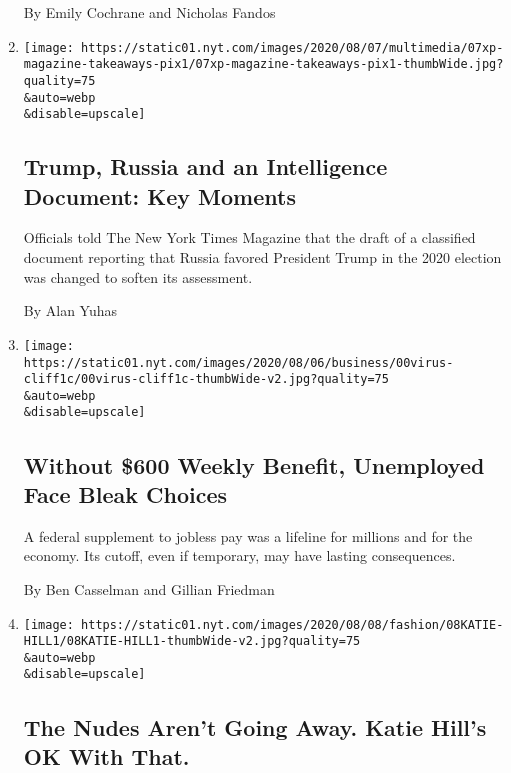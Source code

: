 \begin{enumerate}
  By Emily Cochrane and Nicholas Fandos
\item
  \href{/2020/08/08/us/politics/trump-russia.html}{}

  \texttt{[image: https://static01.nyt.com/images/2020/08/07/multimedia/07xp-magazine-takeaways-pix1/07xp-magazine-takeaways-pix1-thumbWide.jpg?quality=75\\\&auto=webp\\\&disable=upscale]}

  \hypertarget{trump-russia-and-an-intelligence-document-key-moments-1}{%
  \subsection{Trump, Russia and an Intelligence Document: Key
  Moments}\label{trump-russia-and-an-intelligence-document-key-moments-1}}

  Officials told The New York Times Magazine that the draft of a
  classified document reporting that Russia favored President Trump in
  the 2020 election was changed to soften its assessment.

  By Alan Yuhas
\item
  \href{/2020/08/08/business/economy/lost-unemployment-benefits.html}{}

  \texttt{[image: https://static01.nyt.com/images/2020/08/06/business/00virus-cliff1c/00virus-cliff1c-thumbWide-v2.jpg?quality=75\\\&auto=webp\\\&disable=upscale]}

  \hypertarget{without-600-weekly-benefit-unemployed-face-bleak-choices}{%
  \subsection{Without \$600 Weekly Benefit, Unemployed Face Bleak
  Choices}\label{without-600-weekly-benefit-unemployed-face-bleak-choices}}

  A federal supplement to jobless pay was a lifeline for millions and
  for the economy. Its cutoff, even if temporary, may have lasting
  consequences.

  By Ben Casselman and Gillian Friedman
\item
  \href{/2020/08/08/style/katie-hill-she-will-rise-revenge-porn.html}{}

  \texttt{[image: https://static01.nyt.com/images/2020/08/08/fashion/08KATIE-HILL1/08KATIE-HILL1-thumbWide-v2.jpg?quality=75\\\&auto=webp\\\&disable=upscale]}

  \hypertarget{the-nudes-arent-going-away-katie-hills-ok-with-that}{%
  \subsection{The Nudes Aren't Going Away. Katie Hill's OK With
  That.}\label{the-nudes-arent-going-away-katie-hills-ok-with-that}}


\end{enumerate}
